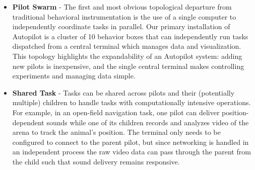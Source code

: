 \documentclass[nohyper, justified, notitlepage, marginals=raggedright,twoside=false,debug]{tufte-autopilot}
\begin{document}
\begin{itemize}
    \item \textbf{Pilot Swarm} - The first and most obvious topological departure from traditional behavioral instrumentation is the use of a single computer to independently coordinate tasks in parallel. Our primary installation of Autopilot is a cluster of 10 behavior boxes that can independently run tasks dispatched from a central terminal which manages data and visualization. This topology highlights the expandability of an Autopilot system: adding new pilots is inexpensive, and the single central terminal makes controlling experiments and managing data simple.
    \item \textbf{Shared Task} -  Tasks can be shared across pilots and their (potentially multiple) children to handle tasks with computationally intensive operations. For example, in an open-field navigation task, one pilot can deliver position-dependent sounds while one of its children records and analyzes video of the arena to track the animal's position. The terminal only needs to be configured to connect to the parent pilot, but since networking is handled in an independent process the raw video data can pass through the parent from the child such that sound delivery remains responsive.

\end{itemize}
\end{document}
